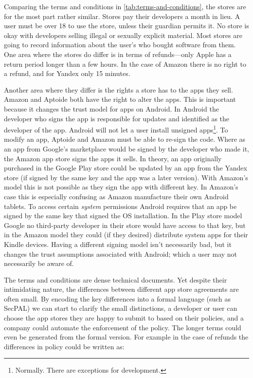\documentclass[thesis.tex]{subfiles}
\begin{document}
Comparing the terms and conditions in \autoref{tab:terms-and-conditions}, the stores are for the most part rather similar.
Stores pay their developers a month in lieu.  A user must be over 18 to use the store, unless their guardian permits it. 
No store is okay with developers selling illegal or sexually explicit material.
Most stores are going to record information about the user's who bought software from them.
One area where the stores do differ is in terms of refunds---only Apple has a return period longer than a few hours.
In the case of Amazon there is no right to a refund, and for Yandex only 15 minutes.

Another area where they differ is the rights a store has to the apps they sell.
Amazon and Aptoide both have the right to alter the apps.
This is important because it changes the trust model for apps on Android.
In Android the developer who signs the app is responsible for updates and identified as the developer of the app. Android will not let a user install unsigned apps\footnote{Normally. There are exceptions for development.}.  To modify an app, Aptoide and Amazon must be able to re-sign the code.  Where as an app from Google's marketplace would be signed by the developer who made it, the Amazon app store signs the apps it sells.
In theory, an app originally purchased in the Google Play store could be updated by an app from the Yandex store (if signed by the same key and the app was a later version).
With Amazon's model this is not possible as they sign the app with different key.
In Amazon's case this is especially confusing as Amazon manufacture their own Android tablets.
To access certain \emph{system} permissions Android requires that an app be signed by the same key that signed the OS installation.
In the Play store model Google no third-party developer in their store would have access to that key, but in the Amazon model they could (if they desired) distribute system apps for their Kindle devices.
Having a different signing model isn't necessarily bad, but it changes the trust assumptions associated with Android; which a user may not necessarily be aware of.


The terms and conditions are dense technical documents.
Yet despite their intimidating nature, the differences between different app store agreements are often small.
By encoding the key differences into a formal language (such as SecPAL) we can start to clarify the small distinctions, a developer or user can choose the app stores they are happy to submit to based on their policies, and a company could automate the enforcement of the policy.
The longer terms could even be generated from the formal version.
For example in the case of refunds the differences in policy could be written as:
\end{document}
